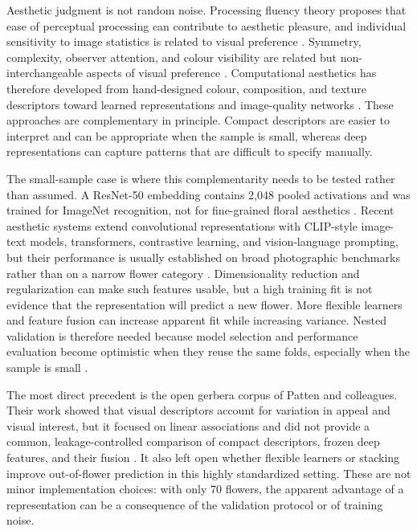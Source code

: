 \documentclass[10pt,letterpaper]{article}
\begin{document}
Aesthetic judgment is not random noise. Processing fluency theory proposes that ease of perceptual processing can contribute to aesthetic pleasure, and individual sensitivity to image statistics is related to visual preference \cite{reber2004,spehar2015,grinde2022}. Symmetry, complexity, observer attention, and colour visibility are related but non-interchangeable aspects of visual preference \cite{mather2023,pombo2023,nath2026,vanderkooi2022,miller2024}. Computational aesthetics has therefore developed from hand-designed colour, composition, and texture descriptors toward learned representations and image-quality networks \cite{datta2006,haralick1973,tamura1978,bianconi2021,talebi2018,ke2021}. These approaches are complementary in principle. Compact descriptors are easier to interpret and can be appropriate when the sample is small, whereas deep representations can capture patterns that are difficult to specify manually.

The small-sample case is where this complementarity needs to be tested rather than assumed. A ResNet-50 embedding contains 2,048 pooled activations and was trained for ImageNet recognition, not for fine-grained floral aesthetics \cite{he2016}. Recent aesthetic systems extend convolutional representations with CLIP-style image-text models, transformers, contrastive learning, and vision-language prompting, but their performance is usually established on broad photographic benchmarks rather than on a narrow flower category \cite{hentschel2022,wang2022clip,sheng2023,levering2024}. Dimensionality reduction and regularization can make such features usable, but a high training fit is not evidence that the representation will predict a new flower. More flexible learners and feature fusion can increase apparent fit while increasing variance. Nested validation is therefore needed because model selection and performance evaluation become optimistic when they reuse the same folds, especially when the sample is small \cite{cawley2010,varoquaux2018}.

The most direct precedent is the open gerbera corpus of Patten and colleagues. Their work showed that visual descriptors account for variation in appeal and visual interest, but it focused on linear associations and did not provide a common, leakage-controlled comparison of compact descriptors, frozen deep features, and their fusion \cite{patten2024}. It also left open whether flexible learners or stacking improve out-of-flower prediction in this highly standardized setting. These are not minor implementation choices: with only 70 flowers, the apparent advantage of a representation can be a consequence of the validation protocol or of training noise.
\end{document}
